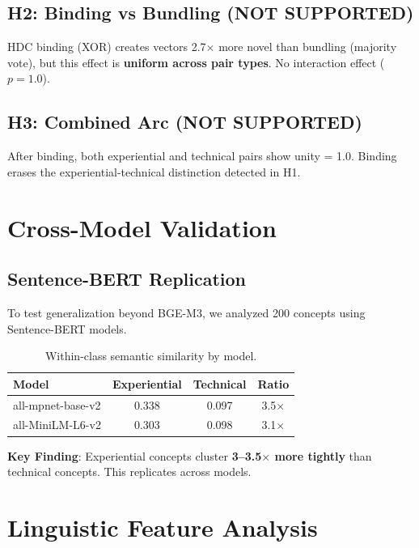 \documentclass[11pt,a4paper]{article}
\newcommand{\pval}{\textit{p}}
\begin{document}
\subsection{H2: Binding vs Bundling (NOT SUPPORTED)}

HDC binding (XOR) creates vectors 2.7$\times$ more novel than bundling (majority vote), but this effect is \textbf{uniform across pair types}. No interaction effect ($\pval = 1.0$).

\subsection{H3: Combined Arc (NOT SUPPORTED)}

After binding, both experiential and technical pairs show unity = 1.0. Binding erases the experiential-technical distinction detected in H1.

\section{Cross-Model Validation}

\subsection{Sentence-BERT Replication}

To test generalization beyond BGE-M3, we analyzed 200 concepts using Sentence-BERT models.

\begin{table}[H]
\centering
\begin{tabular}{lccc}
\toprule
\textbf{Model} & \textbf{Experiential} & \textbf{Technical} & \textbf{Ratio} \\
\midrule
all-mpnet-base-v2 & 0.338 & 0.097 & 3.5$\times$ \\
all-MiniLM-L6-v2 & 0.303 & 0.098 & 3.1$\times$ \\
\bottomrule
\end{tabular}
\caption{Within-class semantic similarity by model.}
\label{tab:cross-model}
\end{table}

\textbf{Key Finding}: Experiential concepts cluster \textbf{3--3.5$\times$ more tightly} than technical concepts. This replicates across models.

\section{Linguistic Feature Analysis}
\end{document}
